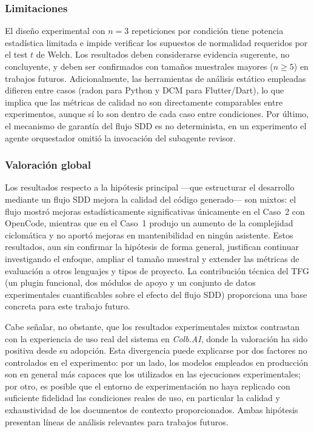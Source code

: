 \documentclass[11pt, letterpaper]{article}
\begin{document}
\subsubsection*{Limitaciones}

El diseño experimental con $n=3$ repeticiones por condición tiene potencia estadística limitada e impide verificar los supuestos de normalidad requeridos por el test $t$ de Welch. Los resultados deben considerarse evidencia sugerente, no concluyente, y deben ser confirmados con tamaños muestrales mayores ($n \geq 5$) en trabajos futuros. Adicionalmente, las herramientas de análisis estático empleadas difieren entre casos (radon para Python y DCM para Flutter/Dart), lo que implica que las métricas de calidad no son directamente comparables entre experimentos, aunque sí lo son dentro de cada caso entre condiciones. Por último, el mecanismo de garantía del flujo SDD es no determinista, en un experimento el agente orquestador omitió la invocación del subagente revisor.

\subsubsection*{Valoración global}

Los resultados respecto a la hipótesis principal ---que estructurar el desarrollo mediante un flujo SDD mejora la calidad del código generado--- son mixtos: el flujo mostró mejoras estadísticamente significativas únicamente en el Caso~2 con OpenCode, mientras que en el Caso~1 produjo un aumento de la complejidad ciclomática y no aportó mejoras en mantenibilidad en ningún asistente. Estos resultados, aun sin confirmar la hipótesis de forma general, justifican continuar investigando el enfoque, ampliar el tamaño muestral y extender las métricas de evaluación a otros lenguajes y tipos de proyecto. La contribución técnica del TFG (un plugin funcional, dos módulos de apoyo y un conjunto de datos experimentales cuantificables sobre el efecto del flujo SDD) proporciona una base concreta para este trabajo futuro.

Cabe señalar, no obstante, que los resultados experimentales mixtos contrastan con la experiencia de uso real del sistema en \textit{Colb.AI}, donde la valoración ha sido positiva desde su adopción. Esta divergencia puede explicarse por dos factores no controlados en el experimento: por un lado, los modelos empleados en producción son en general más capaces que los utilizados en las ejecuciones experimentales; por otro, es posible que el entorno de experimentación no haya replicado con suficiente fidelidad las condiciones reales de uso, en particular la calidad y exhaustividad de los documentos de contexto proporcionados. Ambas hipótesis presentan líneas de análisis relevantes para trabajos futuros.
\end{document}
